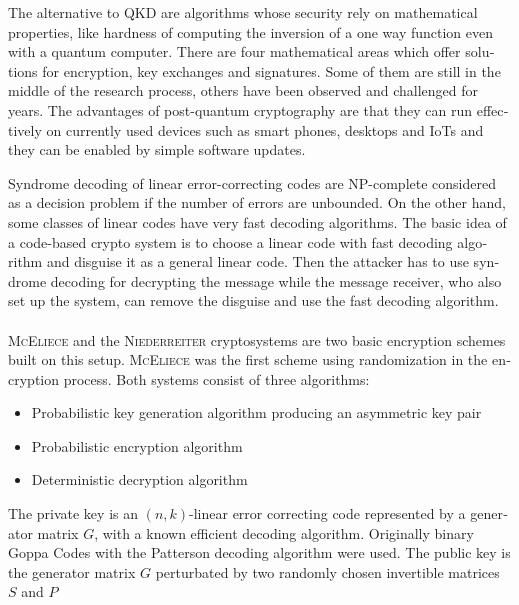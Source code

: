 \documentclass[a4paper,11pt]{article}
\begin{document}
\begin{otherlanguage}{english}
\begin{multicols}{2}
\noindent
The alternative to QKD are algorithms whose security rely on mathematical properties, like hardness of computing the inversion of a one way function even with a quantum computer. There are four mathematical areas which offer solutions for encryption, key exchanges and signatures. Some of them are still in the middle of the research process, others have been observed and challenged for years. The advantages of post-quantum cryptography are that they can run effectively on currently used devices such as smart phones, desktops and IoTs and they can be enabled by simple software updates.

Syndrome decoding of linear error-correcting codes are NP-complete considered as a decision problem if the number of errors are unbounded. On the other hand, some classes of linear codes have very fast decoding algorithms. The basic idea of a code-based crypto system is to choose a linear code with fast decoding algorithm and disguise it as a general linear code. Then the attacker has to use syndrome decoding for decrypting the message while the message receiver, who also set up the system, can remove the disguise and use the fast decoding algorithm. \\
\\
\textsc{McEliece} and the \textsc{Niederreiter} cryptosystems are two basic encryption schemes built on this setup. \textsc{McEliece} was the first scheme using randomization in the encryption process. Both systems consist of three algorithms:

\begin{itemize} [noitemsep, nolistsep]
\item[1)] Probabilistic key generation algorithm producing an asymmetric key pair
\item[2)] Probabilistic encryption algorithm
\item[3)] Deterministic decryption algorithm
\end{itemize} 

\vspace{0.4cm}

The private key is an $(n,k)$-linear error correcting code represented by a generator matrix $G$, with a known efficient decoding algorithm. Originally binary Goppa Codes with the Patterson decoding algorithm were used. The public key is the generator matrix $G$ perturbated by two randomly chosen invertible matrices $S$ and $P$


\end{multicols}
\end{otherlanguage}
\end{document}
